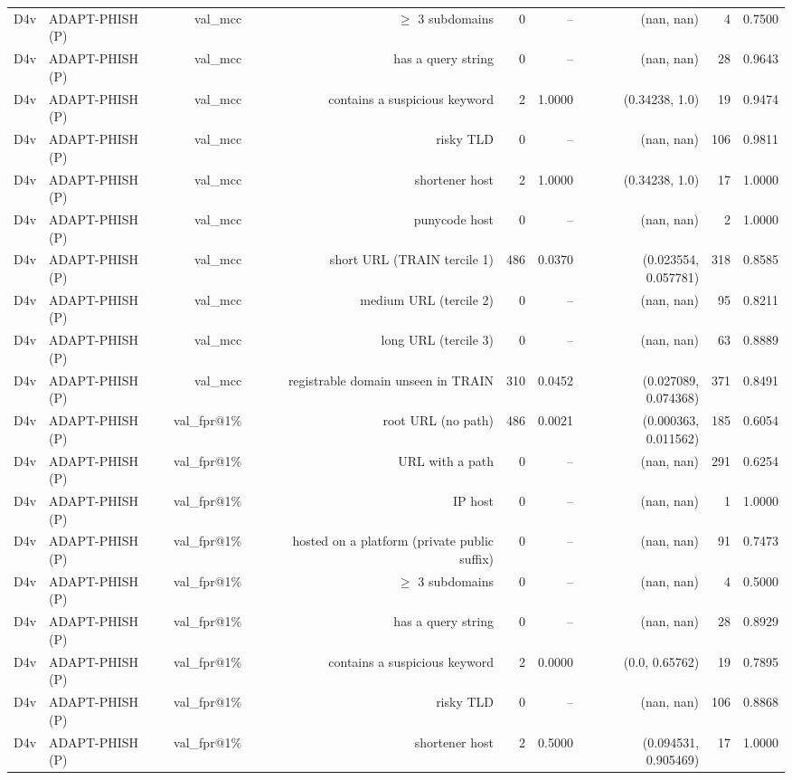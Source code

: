 \begin{table}[t]
\begin{tabular}{llrrrrrrr}
D4v & ADAPT-PHISH (P) & val\_mcc & $\geq$ 3 subdomains & 0 & -- & (nan, nan) & 4 & 0.7500 \\
D4v & ADAPT-PHISH (P) & val\_mcc & has a query string & 0 & -- & (nan, nan) & 28 & 0.9643 \\
D4v & ADAPT-PHISH (P) & val\_mcc & contains a suspicious keyword & 2 & 1.0000 & (0.34238, 1.0) & 19 & 0.9474 \\
D4v & ADAPT-PHISH (P) & val\_mcc & risky TLD & 0 & -- & (nan, nan) & 106 & 0.9811 \\
D4v & ADAPT-PHISH (P) & val\_mcc & shortener host & 2 & 1.0000 & (0.34238, 1.0) & 17 & 1.0000 \\
D4v & ADAPT-PHISH (P) & val\_mcc & punycode host & 0 & -- & (nan, nan) & 2 & 1.0000 \\
D4v & ADAPT-PHISH (P) & val\_mcc & short URL (TRAIN tercile 1) & 486 & 0.0370 & (0.023554, 0.057781) & 318 & 0.8585 \\
D4v & ADAPT-PHISH (P) & val\_mcc & medium URL (tercile 2) & 0 & -- & (nan, nan) & 95 & 0.8211 \\
D4v & ADAPT-PHISH (P) & val\_mcc & long URL (tercile 3) & 0 & -- & (nan, nan) & 63 & 0.8889 \\
D4v & ADAPT-PHISH (P) & val\_mcc & registrable domain unseen in TRAIN & 310 & 0.0452 & (0.027089, 0.074368) & 371 & 0.8491 \\
D4v & ADAPT-PHISH (P) & val\_fpr@1\% & root URL (no path) & 486 & 0.0021 & (0.000363, 0.011562) & 185 & 0.6054 \\
D4v & ADAPT-PHISH (P) & val\_fpr@1\% & URL with a path & 0 & -- & (nan, nan) & 291 & 0.6254 \\
D4v & ADAPT-PHISH (P) & val\_fpr@1\% & IP host & 0 & -- & (nan, nan) & 1 & 1.0000 \\
D4v & ADAPT-PHISH (P) & val\_fpr@1\% & hosted on a platform (private public suffix) & 0 & -- & (nan, nan) & 91 & 0.7473 \\
D4v & ADAPT-PHISH (P) & val\_fpr@1\% & $\geq$ 3 subdomains & 0 & -- & (nan, nan) & 4 & 0.5000 \\
D4v & ADAPT-PHISH (P) & val\_fpr@1\% & has a query string & 0 & -- & (nan, nan) & 28 & 0.8929 \\
D4v & ADAPT-PHISH (P) & val\_fpr@1\% & contains a suspicious keyword & 2 & 0.0000 & (0.0, 0.65762) & 19 & 0.7895 \\
D4v & ADAPT-PHISH (P) & val\_fpr@1\% & risky TLD & 0 & -- & (nan, nan) & 106 & 0.8868 \\
D4v & ADAPT-PHISH (P) & val\_fpr@1\% & shortener host & 2 & 0.5000 & (0.094531, 0.905469) & 17 & 1.0000 \\

\end{tabular}
\end{table}
